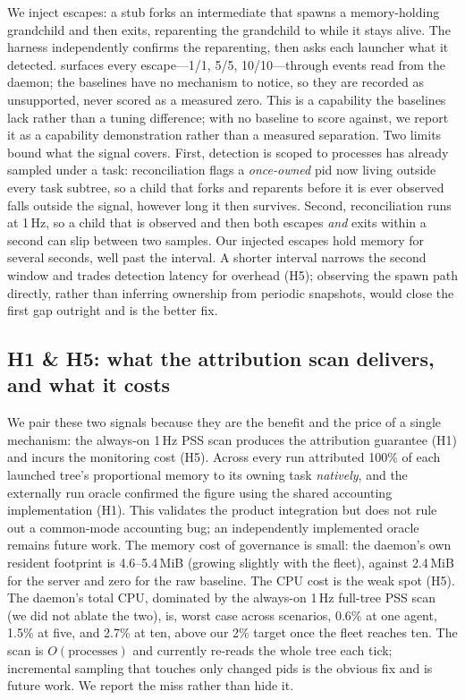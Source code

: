 We inject escapes: a stub forks an intermediate that spawns a memory-holding grandchild and then
exits, reparenting the grandchild to  while it stays alive. The harness independently
confirms the reparenting, then asks each launcher what it detected. \sys{} surfaces every
escape---1/1, 5/5, 10/10---through events read from the daemon; the baselines have no mechanism to
notice, so they are recorded as unsupported, never scored as a measured zero. This is a capability the baselines
lack rather than a tuning difference; with no baseline to score against, we report it as a capability
demonstration rather than a measured separation. Two limits bound what the signal covers. First,
detection is scoped to processes \sys{} has already sampled under a task: reconciliation flags a
\emph{once-owned} pid now living outside every task subtree, so a child that forks and reparents
before it is ever observed falls outside the signal, however long it then survives. Second,
reconciliation runs at 1\,Hz, so a child that is observed and then both escapes \emph{and} exits
within a second can slip between two samples. Our injected escapes hold memory for several seconds,
well past the interval. A shorter interval narrows the second window and trades detection latency for
overhead (H5); observing the spawn path directly, rather than inferring ownership from periodic
snapshots, would close the first gap outright and is the better fix.

\subsection{H1 \& H5: what the attribution scan delivers, and what it costs}
\label{sec:h1h5}

We pair these two signals because they are the benefit and the price of a single mechanism: the
always-on 1\,Hz PSS scan produces the attribution guarantee (H1) and incurs the monitoring cost
(H5). Across every run \sys{} attributed 100\% of each launched tree's proportional memory to its
owning task \emph{natively}, and the externally run oracle confirmed the figure using the shared
accounting implementation (H1). This validates the product integration but does not rule out a
common-mode accounting bug; an independently implemented oracle remains future work. The memory cost
of governance is small: the \sys{} daemon's own resident footprint is 4.6--5.4\,MiB (growing slightly
with the fleet), against 2.4\,MiB for the  server and zero for the raw baseline. The CPU
cost is the weak spot (H5). The \sys{} daemon's total CPU, dominated by the always-on 1\,Hz
full-tree PSS scan (we did not ablate the two), is, worst case across scenarios, 0.6\% at one agent, 1.5\% at five, and 2.7\% at
ten, above our 2\% target once the fleet reaches ten. The scan is $O(\text{processes})$ and currently
re-reads the whole tree each tick; incremental sampling that touches only changed pids is the obvious
fix and is future work. We report the miss rather than hide it.

